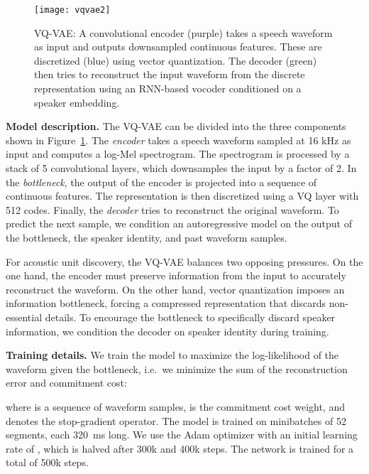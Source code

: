 \documentclass[a4paper]{article}
\newcommand{\imagesep}{\vspace*{-4pt}}
\begin{document}
\begin{figure}[!b]
    \centering
    \texttt{[image: vqvae2]}
        \imagesep
    \caption{
    VQ-VAE:
    A convolutional encoder (purple) takes a speech waveform as input and outputs downsampled continuous features.
    These are discretized (blue) using vector quantization.
    The decoder (green) then tries to reconstruct the input waveform from the discrete representation using an RNN-based vocoder conditioned on a speaker embedding.
}
    \label{fig:vqwav}
\end{figure}

\label{sec:vqvae_model}

\textbf{Model description.}
The VQ-VAE can be divided into the three components shown in Figure~\ref{fig:vqwav}.
The \textit{encoder} takes a speech waveform sampled at 16 kHz as input and computes a log-Mel spectrogram.
The spectrogram is processed by a stack of 5 convolutional layers, which downsamples the input by a factor of 2.
In the \textit{bottleneck}, the output of the encoder is projected into a sequence of continuous features. 
 The representation is then discretized using a VQ layer with 512 codes.
Finally, the \textit{decoder} tries to reconstruct the original waveform. 
To predict the next sample, we condition an autoregressive model on the output of the bottleneck, the speaker identity, and past waveform samples.

For acoustic unit discovery, the VQ-VAE balances two opposing pressures. 
On the one hand, the encoder must preserve information from the input  to accurately reconstruct the waveform.
On the other hand, vector quantization imposes an information bottleneck, forcing a compressed representation that discards non-essential details.
To encourage the bottleneck to specifically discard speaker information, we condition the decoder on speaker identity during training.


\textbf{Training details.}
We train the model to maximize the log-likelihood of the waveform given the bottleneck, i.e.\ we minimize the sum of the reconstruction error and commitment cost:

where  is a sequence of waveform samples,  is the commitment cost weight, and   denotes the stop-gradient operator.
The model is trained on minibatches of 52 segments, each 320~ms long.
We use the Adam optimizer \cite{kingma+ba_iclr15} with an initial learning rate of , which is halved after 300k and 400k steps.
The network is trained for a total of 500k steps.
\end{document}
